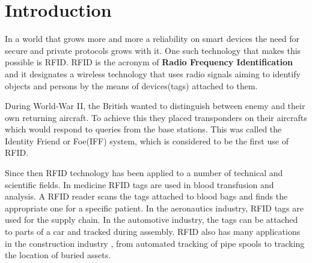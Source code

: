 \chapter*{Introduction} 

    In a world that grows more and more a reliability on smart devices the need for secure and private protocols grows with it. One 
such technology that makes this possible is RFID. RFID is the acronym of \textbf{Radio Frequency Identification} and it designates
a wireless technology that uses radio signals aiming to identify objects and persons by the means of devices(tags) attached to them.

    During World-War II, the British wanted to distinguish between enemy and their own returning aircraft. To achieve this they placed transponders
on their aircrafts which would respond to queries from the base stations. This was called the Identity Friend or Foe(IFF) system, which is considered to be the
first use of RFID.

    Since then RFID technology has been applied to a number of technical and scientific fields. In medicine RFID tags are used in blood transfusion and analysis. 
A RFID reader scans the tags attached to blood bags and finds the appropriate one for a specific patient. In the aeronautics industry, 
RFID tags are used for the supply chain. In the automotive industry, the tags can be attached to parts of a car and tracked during assembly.
RFID also has many applications in the construction industry \cite{Domdouzis}, from automated tracking of pipe spools to tracking the 
location of buried assets.
